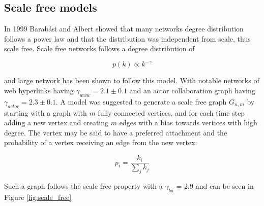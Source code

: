 


\subsection{Scale free models}

In 1999 Barabási and Albert showed that many networks degree distribution follows a power law and that the distribution was independent from scale, thus scale free\cite{barabasi:albert:emergent:scaling}. Scale free networks follows a degree distribution of

\begin{equation}
	 p(k) \propto k^{-\gamma} 
	\label{eq:scale:free}
\end{equation}

and large network has been shown to follow this model. With notable networks of web hyperlinks having $\gamma_{www} = 2.1\pm 0.1$ and an actor collaboration graph having $\gamma_{actor} = 2.3\pm0.1$.
A model was suggested to generate a scale free graph $G_{n, m}$ by starting with a graph with $m$ fully connected vertices, and for each time step adding a new vertex and creating $m$ edges with a bias towards vertices with high degree. The vertex may be said to have a preferred attachment and the probability of a vertex receiving an edge from the new vertex:

\[ p_i = \dfrac{k_i}{\sum_{j}^{}k_j}  \]

Such a graph follows the scale free property with a $\gamma_{ba}$ = 2.9 and can be seen in Figure \ref{fig:scale_free}

